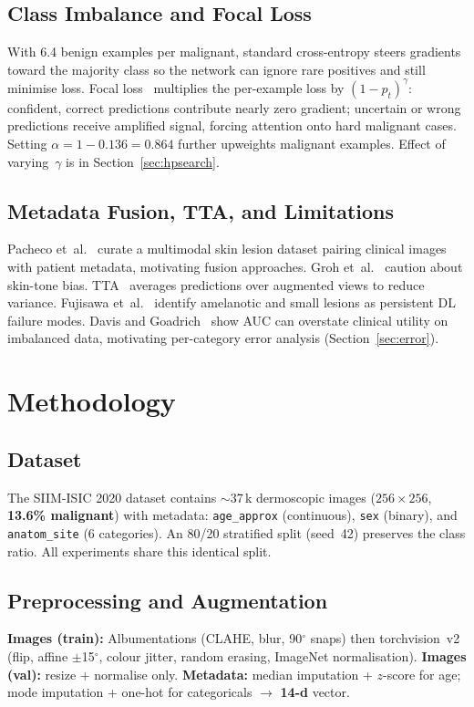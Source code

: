 \documentclass[conference]{IEEEtran}
\begin{document}
\subsection{Class Imbalance and Focal Loss}
With 6.4 benign examples per malignant, standard cross-entropy steers
gradients toward the majority class so the network can ignore rare positives
and still minimise loss. Focal loss~\cite{b11} multiplies the per-example
loss by $(1-p_t)^\gamma$: confident, correct predictions contribute nearly
zero gradient; uncertain or wrong predictions receive amplified signal,
forcing attention onto hard malignant cases. Setting
$\alpha{=}1{-}0.136{=}0.864$ further upweights malignant examples.
Effect of varying~$\gamma$ is in Section~\ref{sec:hpsearch}.

\subsection{Metadata Fusion, TTA, and Limitations}
Pacheco et~al.~\cite{b12} curate a multimodal skin lesion dataset pairing
clinical images with patient metadata, motivating fusion approaches.
Groh et~al.~\cite{b13} caution about skin-tone bias. TTA~\cite{b14}
averages predictions over augmented views to reduce variance. Fujisawa
et~al.~\cite{b15} identify amelanotic and small lesions as persistent DL
failure modes. Davis and Goadrich~\cite{b16} show AUC can overstate
clinical utility on imbalanced data, motivating per-category error analysis
(Section~\ref{sec:error}).

\section{Methodology}

\subsection{Dataset}
The SIIM-ISIC 2020 dataset contains ${\sim}$37\,k dermoscopic images
($256{\times}256$, \textbf{13.6\% malignant}) with metadata:
\texttt{age\_approx} (continuous), \texttt{sex} (binary), and
\texttt{anatom\_site} (6 categories). An 80/20 stratified split (seed~42)
preserves the class ratio. All experiments share this identical split.

\subsection{Preprocessing and Augmentation}
\textbf{Images (train):} Albumentations (CLAHE, blur, 90$^\circ$ snaps) then
torchvision~v2 (flip, affine $\pm$15$^\circ$, colour jitter, random erasing,
ImageNet normalisation). \textbf{Images (val):} resize + normalise only.
\textbf{Metadata:} median imputation + $z$-score for age; mode imputation +
one-hot for categoricals $\rightarrow$ \textbf{14-d} vector.
\end{document}
